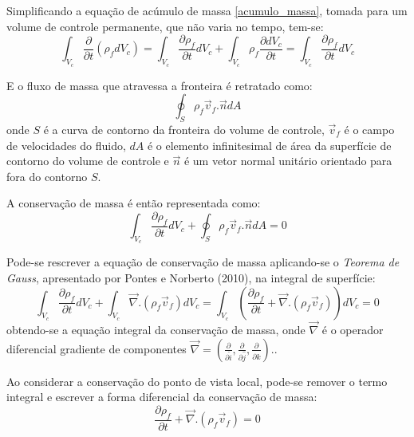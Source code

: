 Simplificando a equação de acúmulo de massa \eqref{acumulo_massa}, tomada para um volume de controle permanente, que não varia no tempo, tem-se:
\begin{equation}
    \int_{V_c}\dfrac{\partial}{\partial t} (\rho_f d V_c) = \int_{V_c}\dfrac{\partial \rho_f}{\partial t} d V_c + \int_{V_c} \rho_f \dfrac{\partial d V_c}{\partial t} = \int_{V_c}\dfrac{\partial \rho_f}{\partial t} d V_c
    \label{acumulo_massa_simp}
\end{equation}

E o fluxo de massa que atravessa a fronteira é retratado como:
\begin{equation}
    \oint_{S}\rho_f \vec{v}_f.\vec{n} dA
    \label{fluxo_massa}
\end{equation}
onde $S$ é a curva de contorno da fronteira do volume de controle, $\vec{v}_f$ é o campo de velocidades do fluido, $dA$ é o elemento infinitesimal de área da superfície de contorno do volume de controle e $\vec{n}$ é um vetor normal unitário orientado para fora do contorno $S$.

A conservação de massa é então representada como:
\begin{equation}
    \int_{V_c}\dfrac{\partial \rho_f}{\partial t} d V_c + \oint_{S}\rho_f \vec{v}_f.\vec{n} dA = 0
    \label{cons_mass}
\end{equation}

Pode-se rescrever a equação de conservação de massa aplicando-se o \textit{Teorema de Gauss}, apresentado por Pontes e Norberto (2010)\cite{pontes_norberto}, na integral de superfície:
\begin{equation}
    \int_{V_c}\dfrac{\partial \rho_f}{\partial t} d V_c + \int_{V_c}\vec{\nabla}.(\rho_f \vec{v}_f) d V_c = 
    \int_{V_c}\left(\dfrac{\partial \rho_f}{\partial t} + \vec{\nabla}.(\rho_f \vec{v}_f) \right)d V_c = 0
    \label{cons_mass_int}
\end{equation}
obtendo-se a equação integral da conservação de massa, onde $\vec{\nabla}$ é o operador diferencial gradiente de componentes $\vec{\nabla}=\left(\tfrac{\partial}{\partial \hat{i}}, \tfrac{\partial}{\partial \hat{j}}, \tfrac{\partial}{\partial \hat{k}}\right)$..

Ao considerar a conservação do ponto de vista local, pode-se remover o termo integral e escrever a forma diferencial da conservação de massa:
\begin{equation}
    \dfrac{\partial \rho_f}{\partial t} + \vec{\nabla}.(\rho_f \vec{v}_f) = 0
    \label{cons_mass_dif}
\end{equation}

